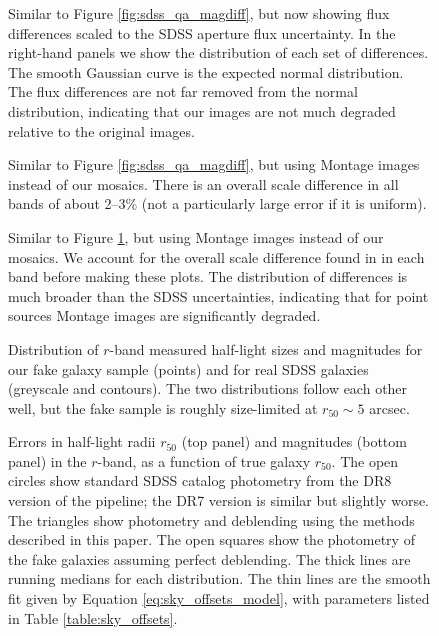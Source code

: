 \documentclass[10pt,preprint]{aastex}
\newcounter{thefigs}
\newcommand{\fignum}{\arabic{thefigs}}
\begin{document}
\clearpage
{}
\begin{figure}
\figurenum{\fignum}
\caption{\label{fig:sdss_qa_scaled} Similar to Figure
\ref{fig:sdss_qa_magdiff}, but now showing flux differences scaled to
the SDSS aperture flux uncertainty. In the right-hand panels we show
the distribution of each set of differences.  The smooth Gaussian
curve is the expected normal distribution. The flux differences are
not far removed from the normal distribution, indicating that our
images are not much degraded relative to the original images.}
\end{figure}


\clearpage
{}
\begin{figure}
\figurenum{\fignum}
\caption{\label{fig:montage_qa_magdiff} Similar to Figure
\ref{fig:sdss_qa_magdiff}, but using Montage images instead of our
mosaics. There is an overall scale difference in all bands of about
2--3\% (not a particularly large error if it is uniform). }
\end{figure}

\clearpage
{}
\begin{figure}
\figurenum{\fignum}
\caption{\label{fig:montage_qa_scaled} Similar to Figure
\ref{fig:sdss_qa_scaled}, but using Montage images instead of our
mosaics. We account for the overall scale difference found in in each band
before making these plots. The distribution of differences is much
broader than the SDSS uncertainties, indicating that for point sources
Montage images are significantly degraded.}
\end{figure}

\clearpage
{}
\begin{figure}
\figurenum{\fignum}
\caption{\label{fig:fakedist} Distribution of $r$-band measured
  half-light sizes and magnitudes for our fake galaxy sample (points)
  and for real SDSS galaxies (greyscale and contours). The two
  distributions follow each other well, but the fake sample is roughly
  size-limited at $r_{50} \sim 5$ arcsec.}
\end{figure}

\clearpage
{}
\begin{figure}
\figurenum{\fignum}
\caption{\label{fig:sky_offsets_ronly} Errors in half-light radii $r_{50}$
  (top panel) and magnitudes (bottom panel) in the $r$-band, as a
  function of true galaxy $r_{50}$. The open circles show standard
  SDSS catalog photometry from the DR8 version of the pipeline; the
  DR7 version is similar but slightly worse. The triangles show
  photometry and deblending using the methods described in this paper.
  The open squares show the photometry of the fake galaxies assuming
  perfect deblending.  The thick lines are running medians for each
  distribution. The thin lines are the smooth fit given by Equation
  \ref{eq:sky_offsets_model}, with parameters listed in Table
  \ref{table:sky_offsets}.}
\end{figure}
\end{document}
